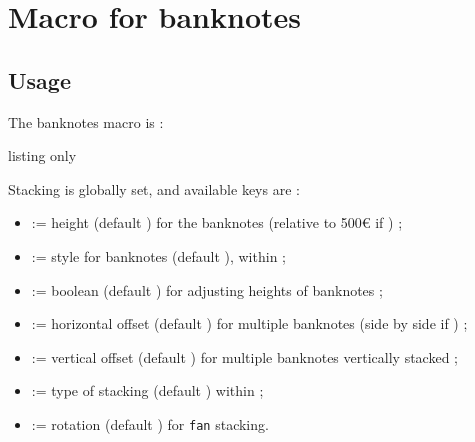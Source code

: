 \documentclass[11pt,a4paper]{ltxdoc}
\begin{document}
\begin{DemoCode}{}
\end{DemoCode}

\begin{DemoCode}{}
\end{DemoCode}

\begin{DemoCode}{}
\end{DemoCode}

\section{Macro for banknotes}

\subsection{Usage}

The banknotes macro is :

\begin{DemoCode}{listing only}
\end{DemoCode}

Stacking is globally set, and available keys are :

\begin{itemize}
	\item {} := height (default \MontreCode{2cm}) for the banknotes (relative to 500€ if ) ;
	\item {} := style for banknotes (default ), within  ;
	\item {} := boolean (default ) for adjusting heights of banknotes ;
	\item {} := horizontal offset (default \MontreCode{0pt}) for multiple banknotes (side by side if \MontreCode{0pt}) ;
	\item {} := vertical offset (default \MontreCode{5mm}) for multiple banknotes vertically stacked ;
	\item {} := type of stacking (default ) within  ;
	\item {} := rotation (default ) for \texttt{fan} stacking.
\end{itemize}
\end{document}
